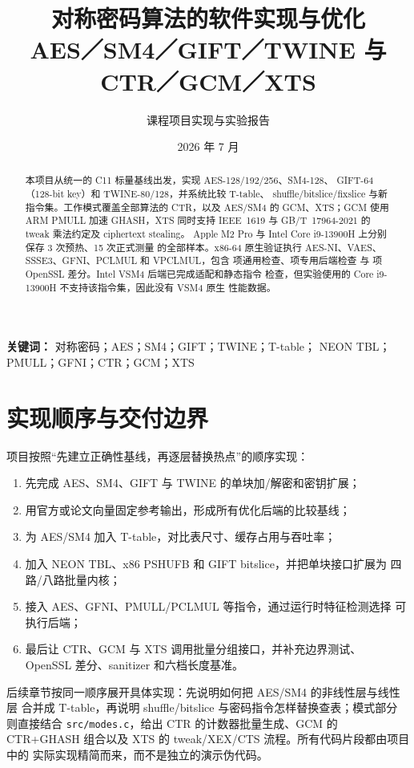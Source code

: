 \documentclass[11pt,a4paper,UTF8,fontset=none]{ctexart}
\title{\bfseries 对称密码算法的软件实现与优化\\[0.4em]
\large AES／SM4／GIFT／TWINE 与 CTR／GCM／XTS}
\author{课程项目实现与实验报告}
\date{2026 年 7 月}
\begin{document}
\maketitle

\begin{abstract}
本项目从统一的 C11 标量基线出发，实现 AES-128/192/256、SM4-128、
GIFT-64（128-bit key）和 TWINE-80/128，并系统比较 T-table、
shuffle/bitslice/fixslice 与新指令集。工作模式覆盖全部算法的 CTR，以及
AES/SM4 的 GCM、XTS；GCM 使用 ARM PMULL 加速 GHASH，XTS 同时支持
IEEE~1619 与 GB/T~17964-2021 的 tweak 乘法约定及 ciphertext stealing。
Apple M2 Pro 与 Intel Core i9-13900H 上分别保存 3 次预热、15 次正式测量
的全部样本。x86-64 原生验证执行 AES-NI、VAES、SSSE3、GFNI、PCLMUL 和
VPCLMUL，包含 \XGenericChecks 项通用检查、\XBackendChecks 项专用后端检查
与 \XOpenSSLChecks 项 OpenSSL 差分。Intel VSM4 后端已完成适配和静态指令
检查，但实验使用的 Core i9-13900H 不支持该指令集，因此没有 VSM4 原生
性能数据。
\end{abstract}

\noindent\textbf{关键词：} 对称密码；AES；SM4；GIFT；TWINE；T-table；
NEON TBL；PMULL；GFNI；CTR；GCM；XTS

\clearpage
\tableofcontents
\clearpage

\section{实现顺序与交付边界}

项目按照“先建立正确性基线，再逐层替换热点”的顺序实现：
\begin{enumerate}
  \item 先完成 AES、SM4、GIFT 与 TWINE 的单块加/解密和密钥扩展；
  \item 用官方或论文向量固定参考输出，形成所有优化后端的比较基线；
  \item 为 AES/SM4 加入 T-table，对比表尺寸、缓存占用与吞吐率；
  \item 加入 NEON TBL、x86 PSHUFB 和 GIFT bitslice，并把单块接口扩展为
  四路/八路批量内核；
  \item 接入 AES、GFNI、PMULL/PCLMUL 等指令，通过运行时特征检测选择
  可执行后端；
  \item 最后让 CTR、GCM 与 XTS 调用批量分组接口，并补充边界测试、
  OpenSSL 差分、sanitizer 和六档长度基准。
\end{enumerate}

后续章节按同一顺序展开具体实现：先说明如何把 AES/SM4 的非线性层与线性层
合并成 T-table，再说明 shuffle/bitslice 与密码指令怎样替换查表；模式部分
则直接结合 \texttt{src/modes.c}，给出 CTR 的计数器批量生成、GCM 的
CTR+GHASH 组合以及 XTS 的 tweak/XEX/CTS 流程。所有代码片段都由项目中的
实际实现精简而来，而不是独立的演示伪代码。
\end{document}
